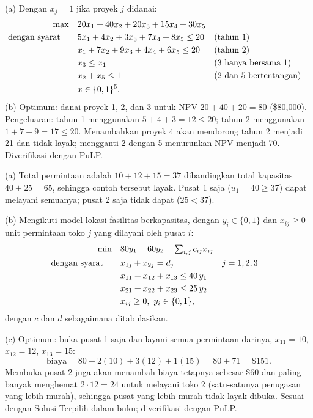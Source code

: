 (a) Dengan $x_j = 1$ jika proyek $j$ didanai:
\[
\begin{aligned}
\max\quad & 20x_1 + 40x_2 + 20x_3 + 15x_4 + 30x_5\\
\mbox{dengan syarat}\quad\quad & 5x_1 + 4x_2 + 3x_3 + 7x_4 + 8x_5 \leq 20 && \mbox{(tahun 1)}\\
& x_1 + 7x_2 + 9x_3 + 4x_4 + 6x_5 \leq 20 && \mbox{(tahun 2)}\\
& x_3 \leq x_1 && \mbox{(3 hanya bersama 1)}\\
& x_2 + x_5 \leq 1 && \mbox{(2 dan 5 bertentangan)}\\
& x \in \{0,1\}^5.
\end{aligned}
\]
(b) Optimum: danai proyek 1, 2, dan 3 untuk NPV $20 + 40 + 20 = 80$ (\$80{,}000). Pengeluaran: tahun 1 menggunakan $5+4+3 = 12 \leq 20$; tahun 2 menggunakan $1+7+9 = 17 \leq 20$. Menambahkan proyek 4 akan mendorong tahun 2 menjadi 21 dan tidak layak; mengganti 2 dengan 5 menurunkan NPV menjadi 70. Diverifikasi dengan PuLP.


(a) Total permintaan adalah $10+12+15 = 37$ dibandingkan total kapasitas $40+25 = 65$, sehingga contoh tersebut layak. Pusat 1 saja ($u_1 = 40 \geq 37$) dapat melayani semuanya; pusat 2 saja tidak dapat ($25 < 37$).

(b) Mengikuti model lokasi fasilitas berkapasitas, dengan $y_i \in \{0,1\}$ dan $x_{ij} \geq 0$ unit permintaan toko $j$ yang dilayani oleh pusat $i$:
\[
\begin{aligned}
\min\quad & 80y_1 + 60y_2 + \textstyle\sum_{i,j} c_{ij}x_{ij}\\
\mbox{dengan syarat}\quad\quad & x_{1j} + x_{2j} = d_j && j = 1,2,3\\
& x_{11} + x_{12} + x_{13} \leq 40\,y_1\\
& x_{21} + x_{22} + x_{23} \leq 25\,y_2\\
& x_{ij} \geq 0,\ y_i \in \{0,1\},
\end{aligned}
\]
dengan $c$ dan $d$ sebagaimana ditabulasikan.

(c) Optimum: buka pusat 1 saja dan layani semua permintaan darinya, $x_{11} = 10$, $x_{12} = 12$, $x_{13} = 15$:
\[
\text{biaya} = 80 + 2(10) + 3(12) + 1(15) = 80 + 71 = \$151.
\]
Membuka pusat 2 juga akan menambah biaya tetapnya sebesar \$60 dan paling banyak menghemat $2 \cdot 12 = 24$ untuk melayani toko 2 (satu-satunya penugasan yang lebih murah), sehingga pusat yang lebih murah tidak layak dibuka. Sesuai dengan Solusi Terpilih dalam buku; diverifikasi dengan PuLP.

